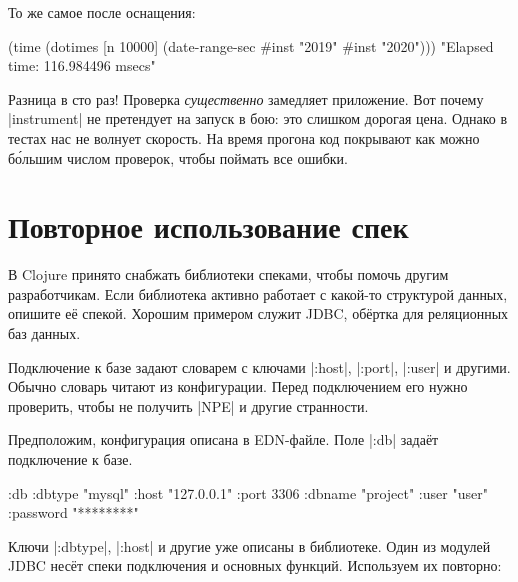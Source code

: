 \noindent
То же самое после оснащения:

\begin{english}
  \begin{clojure}
(time
 (dotimes [n 10000]
   (date-range-sec #inst "2019" #inst "2020")))
"Elapsed time: 116.984496 msecs"
  \end{clojure}
\end{english}


Разница в сто раз! Проверка \emph{существенно} замедляет приложение. Вот почему
\spverb|instrument| не претендует на запуск в бою: это слишком дорогая
цена. Однако в тестах нас не волнует скорость. На время прогона код покрывают
как можно б\'{о}льшим числом проверок, чтобы поймать все ошибки.

\section{Повторное использование спек}


В Clojure принято снабжать библиотеки спеками, чтобы помочь другим
разработчикам. Если библиотека активно работает с какой-то структурой данных,
опишите е\"{е} спекой. Хорошим примером служит
JDBC, об\"{е}ртка для реляционных
баз данных.

Подключение к базе задают словарем с ключами \spverb|:host|, \spverb|:port|,
\spverb|:user| и другими. Обычно словарь читают из конфигурации. Перед
подключением его нужно проверить, чтобы не получить \spverb|NPE| и другие
странности.


Предположим, конфигурация описана в EDN-файле. Поле \spverb|:db| зада\"{е}т
подключение к базе.


\begin{english}
  \begin{clojure}
{:db {:dbtype "mysql"
      :host "127.0.0.1"
      :port 3306
      :dbname "project"
      :user "user"
      :password "********"}}
  \end{clojure}
\end{english}

Ключи \spverb|:dbtype|, \spverb|:host| и другие уже описаны в библиотеке. Один
из модулей JDBC нес\"{е}т спеки подключения и основных функций. Используем их
повторно:

